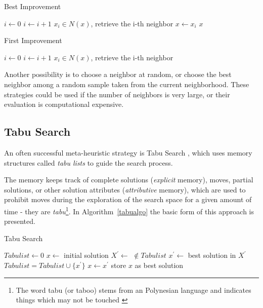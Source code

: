 \begin{algorithm}
\caption{Best Improvement}
\label{bestimprov}
\begin{algorithmic}[1] 
\State $i \gets 0$
\Repeat
\State $i \gets i+1$
\State $x_i \in N(x)$, retrieve the i-th neighbor
    \State $x \gets x_i$
\EndIf
{}
\State \Return $x$
\EndFunction
\end{algorithmic}
\end{algorithm}

\begin{algorithm}
\caption{First Improvement}
\label{firstimprov}
\begin{algorithmic}[1] 
\State $i \gets 0$
\Repeat
\State $i \gets i+1$
\State $x_i \in N(x)$, retrieve the i-th neighbor
\State \Return {}
\EndFunction
\end{algorithmic}
\end{algorithm}

Another possibility is to choose a neighbor at random, or choose the best neighbor among a random sample taken from the current neighborhood. These strategies could be used if the number of neighbors is very large, or their evaluation is computational expensive.

\subsection{Tabu Search} \label{sec:tabu}
An often successful meta-heuristic strategy is Tabu Search \cite{glover1988tabu}, which uses memory structures called \emph{tabu lists} to guide the search process.

The memory keeps track of complete solutions (\emph{explicit} memory), moves, partial solutions, or other solution attributes (\emph{attributive} memory), which are used to prohibit moves during the exploration of the search space for a given amount of time - they are \emph{tabu}\footnote{The word tabu (or taboo) stems from an Polynesian language and indicates things which may not be touched \cite{glover1997tabu}}. In Algorithm~\ref{tabualgo} the basic form of this approach is presented. 

\begin{algorithm}
\caption{Tabu Search}
\label{tabualgo}
\begin{algorithmic}[1]
\State $Tabulist \gets 0$
\State $x\gets$ initial solution
\Repeat
 \State $X^\prime \gets$  $\not\in Tabulist$
 \State $x^\prime \gets$ best solution in $X^\prime$
 \State $Tabulist = Tabulist \cup \{x^\prime\}$
 \State $x \gets x^\prime$
   \State store $x$ as best solution
 \EndIf
{}
\end{algorithmic}
\end{algorithm}

